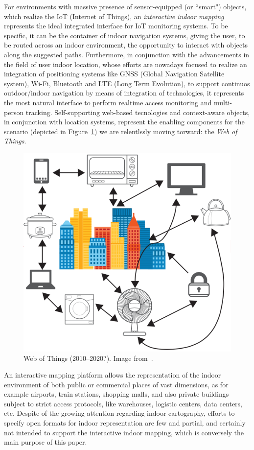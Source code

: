 \documentclass[]{egpubl}
\begin{document}
For environments with massive presence of sensor-equipped (or ``smart")
objects, which realize the IoT (Internet of Things), an \emph{interactive indoor
mapping} represents the ideal integrated interface for IoT monitoring systems.
To be specific, it can be the container of indoor navigation systems, giving
the user, to be routed across an indoor environment, the opportunity to
interact with objects along the suggested paths. Furthermore, in conjunction
with the advancements in the field of user indoor location, whose efforts are
nowadays focused to realize an integration of positioning systems like GNSS
(Global Navigation Satellite system), Wi-Fi, Bluetooth and LTE (Long Term
Evolution), to support continuos outdoor/indoor navigation by means of
integration of technologies, it represents the most natural interface to
perform realtime access monitoring and multi-person tracking. Self-supporting web-based
tecnologies and context-aware objects, in conjunction  with
location systems, represent the enabling components for the scenario (depicted in
Figure~\ref{fig:web-of-thing}) we are relentlssly moving torward: the \emph{Web of
Things}.

\begin{figure}[htbp]
\centering
\includegraphics[width=.5\linewidth]{images/webOfThings.pdf}
\caption{Web of Things (2010--2020?).  Image from~\cite{webOfThings:2015}.}
\label{fig:web-of-thing}
\end{figure}


An interactive mapping platform allows the representation of the indoor
environment of  both public or commercial places of vast dimensions, as for
example airports, train stations, shopping malls, and also private buildings
subject to strict access protocols, like warehouses, logistic centers, data
centers, etc. Despite of the growing attention regarding indoor cartography,
efforts to specify open formats for indoor representation are few and partial,
and certainly not intended to support the interactive indoor mapping, which is
conversely the main purpose of this paper.
\end{document}

